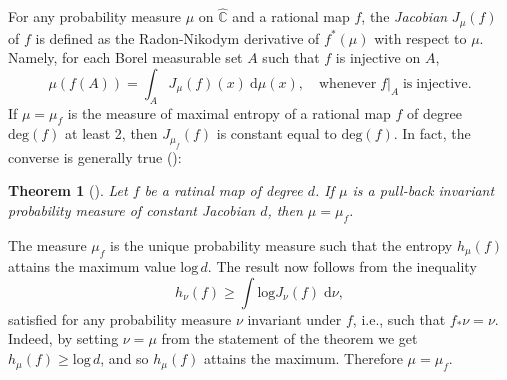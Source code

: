 \documentclass[12pt]{amsart}
\makeatletter
\newtheorem{thm}{Theorem}[section]
\newtheorem*{pf}{Proof}
\newcommand{\C}{\mathbb{C}}
\newcommand{\hC}{\widehat{\C}}
\renewenvironment{pf}[1][\proofname]{%
  \par
  \pushQED{\qed}%
  \normalfont\topsep6\p@ \@plus6\p@ \trivlist
  \item[\hskip\labelsep\itshape
        \bfseries #1\@addpunct{:}]%
  \ignorespaces
}{%
  \popQED\endtrivlist
}
\makeatother
\begin{document}
For any probability measure $\mu$ on $\hC$ and a rational map $f$, 
the \textit{Jacobian} $J_\mu(f)$ of $f$ is defined as the Radon-Nikodym derivative of $f^*(\mu)$ with respect to $\mu$. Namely,
for each Borel measurable set $A$ such that $f$ is injective on $A$, 
$$\mu(f(A))=\int_A J_\mu(f)(x)\:\mathrm{d}\mu(x),\quad \mathrm{whenever}\; f|_A \;\mathrm{is}\; \mathrm{injective}.$$ 
If $\mu=\mu_f$ is the 
 measure of maximal entropy of a rational map $f$ of degree $\mathrm{deg}(f)$ at least 2, then $J_{\mu_f}(f)$ is constant equal to $\mathrm{deg}(f)$.
In fact, the converse is generally true (\cite[Theorem 1.118]{DS}):
\begin{thm}[\cite{DS}]\label{thm:constJac}
	Let $f$ be a ratinal map of degree $d$. If $\mu$ is a pull-back invariant probability measure of constant Jacobian $d$,
	then $\mu=\mu_f$.
\end{thm}
\begin{pf} The measure 
	$\mu_f$ is the unique probability measure such that the entropy $h_{\mu}(f)$ attains the maximum value $\mathrm{log}\, d$. The result now follows from the inequality~\cite{Pa} 
	$$h_\nu(f)\geq \int \mathrm{log}J_\nu(f)\;\mathrm{d}\nu,$$
	satisfied for any probability measure $\nu$ invariant under $f$, i.e., such that $f_*\nu=\nu$. Indeed, by setting $\nu=\mu$ from the statement of the theorem we get $h_\mu(f)\geq \mathrm{log}\, d$, and so $h_{\mu}(f)$ attains the maximum. Therefore $\mu=\mu_f$.  
\end{pf}  
\end{document}
